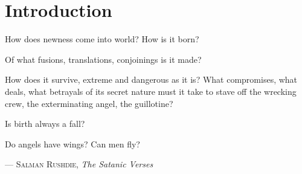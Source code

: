 \chapter*{Introduction}

\epigraph{How does newness come into world? How is it born?

    Of what fusions, translations, conjoinings is it made?

    How does it survive, extreme and dangerous as it is? What compromises, what deals,
    what betrayals of its secret nature must it take to stave off the wrecking crew, the
    exterminating angel, the guillotine?

    Is birth always a fall?

    Do angels have wings? Can men fly?}{
    --- \textsc{Salman Rushdie}, \textit{The Satanic Verses}}


